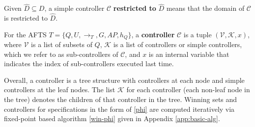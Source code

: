 Given $\widehat{D} \subseteq D$, a simple controller $ \mathcal{C} $ \textbf{restricted to} $ \widehat{D} $ means that the domain of $ \mathcal{C} $ is restricted to $\widehat{D}$.

\begin{definition}
	For the AFTS $ T=\{Q,U,\rightarrow_T,G,AP,h_Q\} $, a \textbf{controller} $ \mathcal{C} $ is a tuple $ (\mathcal{V},\mathcal{K},x) $, where $ \mathcal{V} $ is a list of subsets of $ Q $, $ \mathcal{K} $ is a list of controllers or simple controllers, {\color{black} which we refer to as} sub-controllers of $ \mathcal{C} $, and $ x $ is an internal variable that indicates the index of sub-controllers executed last time. %
	
	\label{def:cont}
\end{definition}


Overall, a controller is a tree structure with controllers at each node and simple controllers at the leaf nodes. The list $\mathcal{K}$ for each controller (each non-leaf node in the tree) denotes the children of that controller in the tree. Winning sets and controllers for specifications in the form of \eqref{phi} are computed iteratively via fixed-point based algorithm \eqref{win-phi} given in Appendix \ref{app:basic-alg}.



